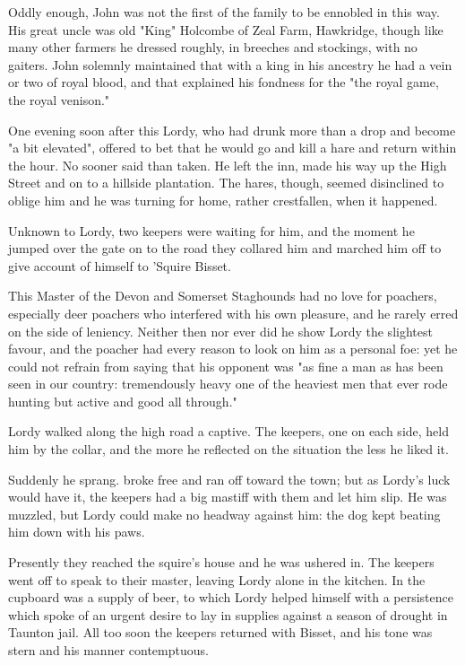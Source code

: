 Oddly enough, John was not the first of the family to be ennobled in this way. His great uncle was old "King" Holcombe of Zeal Farm, Hawkridge, though like many other farmers he dressed roughly, in breeches and stockings, with no gaiters. John solemnly maintained that with a king in his ancestry he had a vein or two of royal blood, and that explained his fondness for the "the royal game, the royal venison."

One evening soon after this Lordy, who had drunk more than a drop and become "a bit elevated", offered to bet that he would go and kill a hare and return within the hour. No sooner said than taken. He left the inn, made his way up the High Street and on to a hillside plantation. The hares, though, seemed disinclined to oblige him and he was turning for home, rather crestfallen, when it happened.

Unknown to Lordy, two keepers were waiting for him, and the moment he jumped over the gate on to the road they collared him and marched him off to give account of himself to 'Squire Bisset.

This Master of the Devon and Somerset Staghounds had no love for poachers, especially deer poachers who interfered with his own pleasure, and he rarely erred on the side of leniency. Neither then nor ever did he show Lordy the slightest favour, and the poacher had every reason to look on him as a personal foe: yet he could not refrain from saying that his opponent was "as fine a man as has been seen in our country: tremendously heavy   one of the heaviest men that ever rode hunting   but active and good all through."

Lordy walked along the high road a captive. The keepers, one on each side, held him by the collar, and the more he reflected on the situation the less he liked it.

Suddenly he sprang. broke free and ran off toward the town; but as Lordy's luck would have it, the keepers had a big mastiff with them and let him slip. He was muzzled, but Lordy could make no headway against him: the dog kept beating him down with his paws.

Presently they reached the squire's house and he was ushered in. The keepers went off to speak to their master, leaving Lordy alone in the kitchen. In the cupboard was a supply of beer, to which Lordy helped himself with a persistence which spoke of an urgent desire to lay in supplies against a season of drought in Taunton jail. All too soon the keepers returned with Bisset, and his tone was stern and his manner contemptuous.


